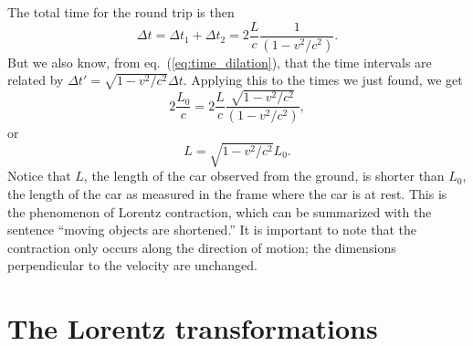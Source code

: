 \noindent
The total time for the round trip is then
\begin{equation}
\Delta t=\Delta t_1+\Delta t_2=2\frac{L}{c}\frac{1}{(1-v^2/c^2)}.
\end{equation}
But we also know, from eq.\ (\ref{eq:time_dilation}), that the time intervals are related by $\Delta t'=\sqrt{1-v^2/c^2}\Delta t$. Applying this to the times we just found, we get
\begin{equation}
 2\frac{L_0}{c}=2\frac{L}{c}\frac{\sqrt{1-v^2/c^2}}{(1-v^2/c^2)},
\end{equation}
or
\begin{equation}
L=\sqrt{1-v^2/c^2}L_0.
\end{equation}
Notice that $L$, the length of the car observed from the ground, is shorter than $L_0$, the length of the car as measured in the frame where the car is at rest. This is the phenomenon of Lorentz contraction, which can be summarized with the sentence ``moving objects are shortened.'' It is important to note that the contraction only occurs along the direction of motion; the dimensions perpendicular to the velocity are unchanged.

\section{The Lorentz transformations}

